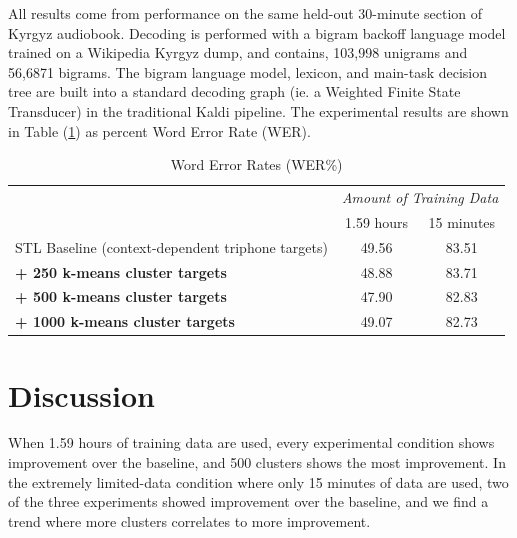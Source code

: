 \documentclass[a4paper]{article}
\begin{document}
All results come from performance on the same held-out 30-minute section of Kyrgyz audiobook. Decoding is performed with a bigram backoff language model trained on a Wikipedia Kyrgyz dump, and contains, 103,998 unigrams and 56,6871 bigrams. The bigram language model, lexicon, and main-task decision tree are built into a standard decoding graph (ie. a Weighted Finite State Transducer) in the traditional Kaldi pipeline. The experimental results are shown in Table (\ref{tab:results}) as percent Word Error Rate (WER).


\begin{table}[!htbp]
  \centering
  \caption{Word Error Rates (WER\%)}
    \label{tab:results}
  \begin{adjustbox}{width=.4\textwidth}
    \begin{tabular}{lcc}
      \toprule
      & \multicolumn{2}{c}{ \textit{Amount of Training Data}}\\
      & 1.59 hours & 15 minutes \\
      \midrule
      STL Baseline (context-dependent triphone targets)                            & 49.56       &  83.51 \\
      \textbf{+ 250 k-means cluster targets}        & 48.88            & 83.71 \\
      \textbf{+ 500 k-means cluster targets}        & 47.90       & 82.83 \\
      \textbf{+ 1000 k-means cluster targets}        & 49.07       & 82.73 \\
      \midrule
      \bottomrule
    \end{tabular}
  \end{adjustbox}
\end{table}




\section{Discussion}


When 1.59 hours of training data are used, every experimental condition shows improvement over the baseline, and 500 clusters shows the most improvement. In the extremely limited-data condition where only 15 minutes of data are used, two of the three experiments showed improvement over the baseline, and we find a trend where more clusters correlates to more improvement.
\end{document}
